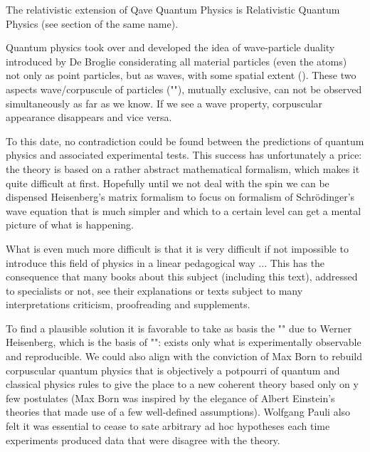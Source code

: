 	\begin{tcolorbox}[title=Remark,colframe=black,arc=10pt]
	The relativistic extension of Qave Quantum Physics is Relativistic Quantum Physics (see section of the same name).
	\end{tcolorbox}
	
	Quantum physics took over and developed the idea of wave-particle duality introduced by De Broglie considerating all material particles (even the atoms) not only as point particles, but as waves, with some spatial extent (). These two aspects wave/corpuscule of particles (""), mutually exclusive, can not be observed simultaneously as far as we know. If we see a wave property, corpuscular appearance disappears and vice versa.
	
	To this date, no contradiction could be found between the predictions of quantum physics and associated experimental tests. This success has unfortunately a price: the theory is based on a rather abstract mathematical formalism, which makes it quite difficult at first. Hopefully until we not deal with the spin we can be dispensed Heisenberg's matrix formalism to focus on formalism of Schrödinger's wave equation that is much simpler and which to a certain level can get a mental picture of what is happening.
	
	What is even much more difficult is that it is very difficult if not impossible to introduce this field of physics in a linear pedagogical way ... This has the consequence that many books about this subject (including this text), addressed to specialists or not, see their explanations or texts subject to many interpretations criticism, proofreading and supplements.
	
	To find a plausible solution it is favorable to take as basis the "" due to Werner Heisenberg, which is the basis of "": exists only what is experimentally observable and reproducible. We could also align with the conviction of Max Born to rebuild corpuscular quantum physics that is objectively a potpourri of quantum and classical physics rules to give the place to a new coherent theory based only on y few postulates (Max Born was inspired by the elegance of Albert Einstein's theories that made use of a few well-defined assumptions). Wolfgang Pauli also felt it was essential to cease to sate arbitrary ad hoc hypotheses each time experiments produced data that were disagree with the theory.
	
